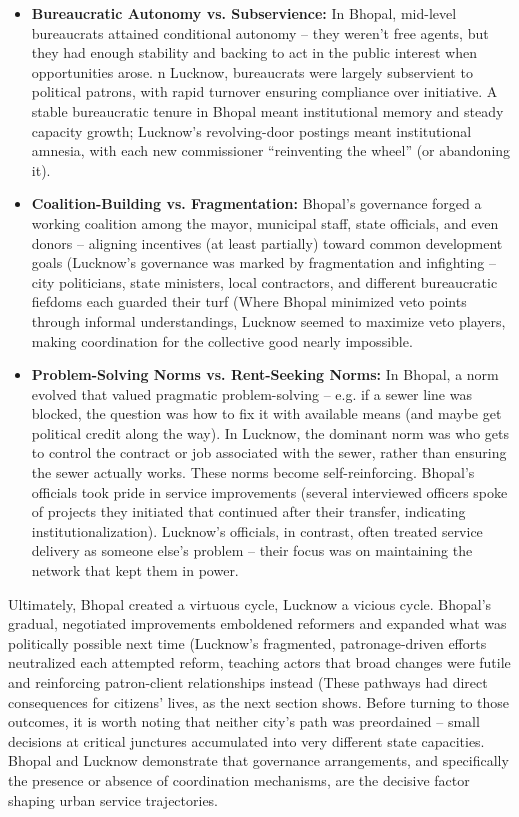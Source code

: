 \begin{itemize}
\item \textbf{Bureaucratic Autonomy vs. Subservience:} In Bhopal, mid-level bureaucrats attained conditional autonomy – they weren't free agents, but they had enough stability and backing to act in the public interest when opportunities arose. n Lucknow, bureaucrats were largely subservient to political patrons, with rapid turnover ensuring compliance over initiative. A stable bureaucratic tenure in Bhopal meant institutional memory and steady capacity growth; Lucknow's revolving-door postings meant institutional amnesia, with each new commissioner ``reinventing the wheel'' (or abandoning it).
\item \textbf{Coalition-Building vs. Fragmentation:} Bhopal's governance forged a working coalition among the mayor, municipal staff, state officials, and even donors – aligning incentives (at least partially) toward common development goals (Lucknow's governance was marked by fragmentation and infighting – city politicians, state ministers, local contractors, and different bureaucratic fiefdoms each guarded their turf (Where Bhopal minimized veto points through informal understandings, Lucknow seemed to maximize veto players, making coordination for the collective good nearly impossible.
\item \textbf{Problem-Solving Norms vs. Rent-Seeking Norms:} In Bhopal, a norm evolved that valued pragmatic problem-solving – e.g. if a sewer line was blocked, the question was how to fix it with available means (and maybe get political credit along the way). In Lucknow, the dominant norm was who gets to control the contract or job associated with the sewer, rather than ensuring the sewer actually works. These norms become self-reinforcing. Bhopal's officials took pride in service improvements (several interviewed officers spoke of projects they initiated that continued after their transfer, indicating institutionalization). Lucknow's officials, in contrast, often treated service delivery as someone else's problem – their focus was on maintaining the network that kept them in power.
\end{itemize}

Ultimately, Bhopal created a virtuous cycle, Lucknow a vicious cycle. Bhopal's gradual, negotiated improvements emboldened reformers and expanded what was politically possible next time (Lucknow's fragmented, patronage-driven efforts neutralized each attempted reform, teaching actors that broad changes were futile and reinforcing patron-client relationships instead (These pathways had direct consequences for citizens' lives, as the next section shows. Before turning to those outcomes, it is worth noting that neither city's path was preordained – small decisions at critical junctures accumulated into very different state capacities. Bhopal and Lucknow demonstrate that governance arrangements, and specifically the presence or absence of coordination mechanisms, are the decisive factor shaping urban service trajectories.

